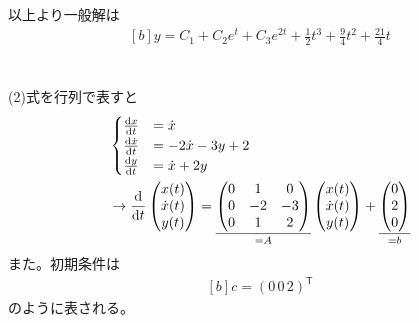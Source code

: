 \documentclass[../ap_2014.tex]{subfiles}
\begin{document}
以上より一般解は
\begin{equation}\begin{aligned}[b]
    y = C_1 + C_2e^{t}+C_3e^{2t} + \frac{1}{2}t^3+\frac{9}{4}t^2+\frac{21}{4}t
\end{aligned}\end{equation}

\section{}
\subsection{}
(2)式を行列で表すと
\begin{equation}\begin{aligned}[b]
    &\begin{cases}
        \dv{x}{t} &= \dot{x}\\
        \dv{\dot{x}}{t} &= -2\dot{x}-3y+2\\
        \dv{y}{t} &= \dot{x}+2y
    \end{cases}\\
    &\rightarrow
    \dv{t}\begin{pmatrix}
        x(t)\\
        \dot{x}(t)\\
        y(t)
    \end{pmatrix}
    =\underset{=A}{\underline{\begin{pmatrix}
        0 & 1 & 0\\
        0 & -2 & -3\\
        0 & 1 & 2
    \end{pmatrix}}}
    \begin{pmatrix}
        x(t)\\
        \dot{x}(t)\\
        y(t)
    \end{pmatrix}
    +\underset{=b}{\underline{\begin{pmatrix}
        0\\
        2\\
        0
    \end{pmatrix}}}
\end{aligned}\end{equation}
また。初期条件は
\begin{equation}\begin{aligned}[b]
    c = (0\,0\,2)^\mathsf{T}
\end{aligned}\end{equation}
のように表される。
\end{document}
